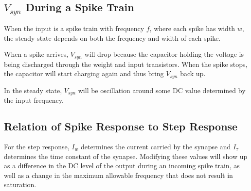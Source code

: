 \subsection{\(V_{syn}\) During a Spike Train}
When the input is a spike train with frequency \(f\), where each spike has width \(w\), the steady state depends
on both the frequency and width of each spike. 

When a spike arrives, \(V_{syn}\) will drop because the capacitor holding the voltage is being discharged through the
weight and input transistors. When the spike stops, the capacitor will start charging again and thus bring \(V_{syn}\) back up.

In the steady state, \(V_{syn}\) will be oscillation around some DC value determined by the input frequency.

\subsection{Relation of Spike Response to Step Response}
For the step response, \(I_w\) determines the current carried by the synapse and \(I_\tau\) determines the time constant of the 
synapse. Modifying these values will show up as a difference in the DC level of the output during an incoming spike train, as well
as a change in the maximum allowable frequency that does not result in saturation.
    

